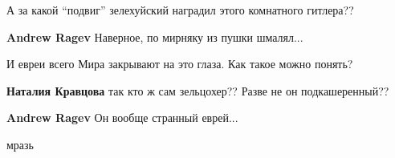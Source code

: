 \begin{itemize}
А за какой \enquote{подвиг} зелехуйский наградил этого комнатного гитлера??

\begin{itemize} %
\textbf{Andrew Ragev} Наверное, по мирняку из пушки шмалял...

И евреи всего Мира закрывают на это глаза. Как такое можно понять?

\textbf{Наталия Кравцова} так кто ж сам зельцохер?? Разве не он подкашеренный??

\textbf{Andrew Ragev} Он вообще странный еврей...
\end{itemize} %

мразь


\end{itemize} %
